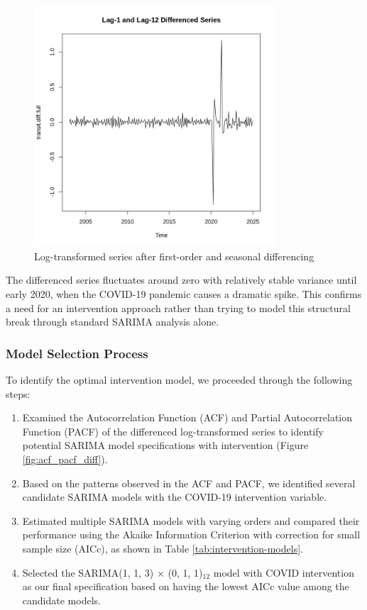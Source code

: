 \documentclass[11pt]{article}
\begin{document}
\begin{figure}[!ht]
\centering
\includegraphics[width=0.8\textwidth]{diff_series_full.png}
\caption{Log-transformed series after first-order and seasonal differencing}
\label{fig:diff_full_series}
\end{figure}

The differenced series fluctuates around zero with relatively stable variance until early 2020, when the COVID-19 pandemic causes a dramatic spike. This confirms a need for an intervention approach rather than trying to model this structural break through standard SARIMA analysis alone.

\subsubsection{Model Selection Process}

To identify the optimal intervention model, we proceeded through the following steps:

\begin{enumerate}
\item Examined the Autocorrelation Function (ACF) and Partial Autocorrelation Function (PACF) of the differenced log-transformed series to identify potential SARIMA model specifications with intervention (Figure \ref{fig:acf_pacf_diff}).

\item Based on the patterns observed in the ACF and PACF, we identified several candidate SARIMA models with the COVID-19 intervention variable.

\item Estimated multiple SARIMA models with varying orders and compared their performance using the Akaike Information Criterion with correction for small sample size (AICc), as shown in Table \ref{tab:intervention-models}.

\item Selected the SARIMA(1, 1, 3) × (0, 1, 1)$_{12}$ model with COVID intervention as our final specification based on having the lowest AICc value among the candidate models.
\end{enumerate}
\end{document}
